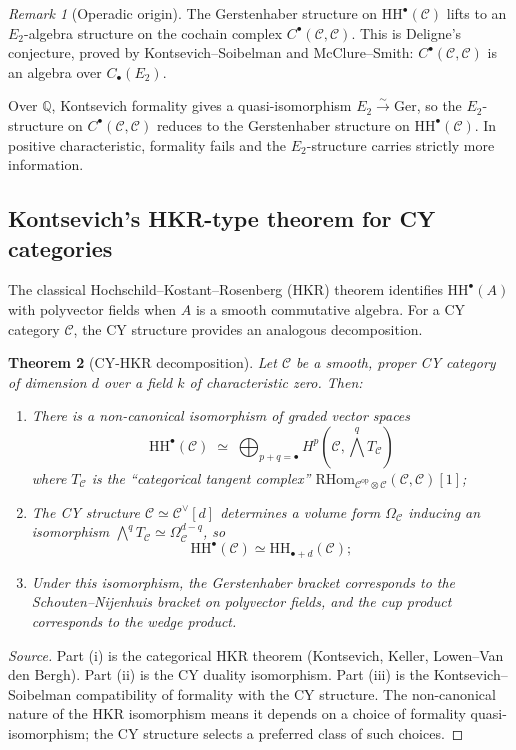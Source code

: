 \documentclass[11pt]{article}
\theoremstyle{plain}
\newtheorem{theorem}{Theorem}[section]
\theoremstyle{definition}
\theoremstyle{remark}
\newtheorem{remark}[theorem]{Remark}
\newcommand{\Etwo}{E_2}
\newcommand{\RHom}{\mathrm{RHom}}
\newcommand{\op}{\mathrm{op}}
\newcommand{\HH}{\mathrm{HH}}
\newcommand{\Ger}{\mathrm{Ger}}
\newcommand{\cC}{\mathcal{C}}
\begin{document}
\begin{remark}[Operadic origin]
\label{rem:e2-gerstenhaber}
The Gerstenhaber structure on $\HH^\bullet(\cC)$ lifts to an $\Etwo$-algebra structure on the cochain complex $C^\bullet(\cC, \cC)$. This is Deligne's conjecture, proved by Kontsevich--Soibelman and McClure--Smith: $C^\bullet(\cC, \cC)$ is an algebra over $C_\bullet(\Etwo)$.

Over $\mathbb{Q}$, Kontsevich formality gives a quasi-isomorphism $\Etwo \xrightarrow{\sim} \Ger$, so the $\Etwo$-structure on $C^\bullet(\cC, \cC)$ reduces to the Gerstenhaber structure on $\HH^\bullet(\cC)$. In positive characteristic, formality fails and the $\Etwo$-structure carries strictly more information.
\end{remark}

\subsection{Kontsevich's HKR-type theorem for CY categories}
\label{sec:kontsevich-hkr}

The classical Hochschild--Kostant--Rosenberg (HKR) theorem identifies $\HH^\bullet(A)$ with polyvector fields when $A$ is a smooth commutative algebra. For a CY category $\cC$, the CY structure provides an analogous decomposition.

\begin{theorem}[CY-HKR decomposition]
\label{thm:cy-hkr}
Let $\cC$ be a smooth, proper CY category of dimension $d$ over a field $k$ of characteristic zero. Then:
\begin{enumerate}[label=(\roman*)]
\item There is a non-canonical isomorphism of graded vector spaces
\[
\HH^\bullet(\cC) \;\simeq\; \bigoplus_{p+q = \bullet} H^p(\cC, \bigwedge^q T_\cC)
\]
where $T_\cC$ is the ``categorical tangent complex'' $\RHom_{\cC^{\op} \otimes \cC}(\cC, \cC)[1]$;
\item The CY structure $\cC \simeq \cC^\vee[d]$ determines a volume form $\Omega_\cC$ inducing an isomorphism $\bigwedge^q T_\cC \simeq \Omega^{d-q}_\cC$, so
\[
\HH^\bullet(\cC) \simeq \HH_{\bullet + d}(\cC);
\]
\item Under this isomorphism, the Gerstenhaber bracket corresponds to the Schouten--Nijenhuis bracket on polyvector fields, and the cup product corresponds to the wedge product.
\end{enumerate}
\end{theorem}

\begin{proof}[Source]
Part (i) is the categorical HKR theorem (Kontsevich, Keller, Lowen--Van den Bergh). Part (ii) is the CY duality isomorphism. Part (iii) is the Kontsevich--Soibelman compatibility of formality with the CY structure. The non-canonical nature of the HKR isomorphism means it depends on a choice of formality quasi-isomorphism; the CY structure selects a preferred class of such choices.
\end{proof}
\end{document}
